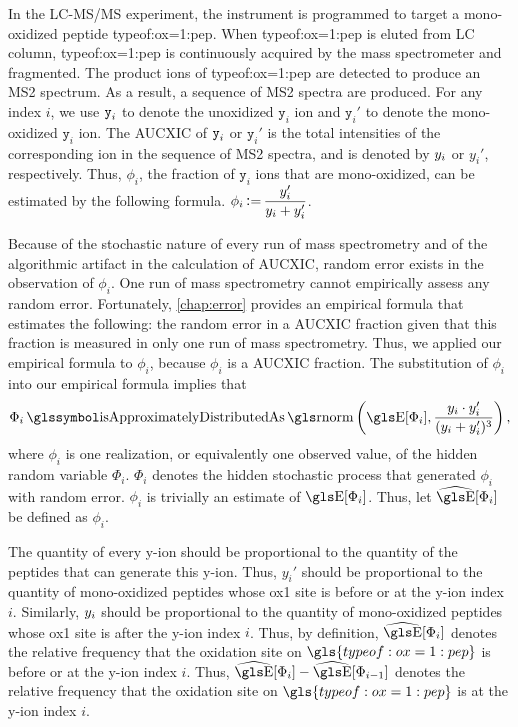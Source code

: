 In the \gls{LC-MS/MS} experiment, the instrument is programmed to target a \gls{mono-oxidized} peptide \gls{typeof:ox=1:pep}. 
When \gls{typeof:ox=1:pep} is eluted from \gls{LC} column, \gls{typeof:ox=1:pep} is continuously acquired by the mass spectrometer and fragmented. 
The product ions of \gls{typeof:ox=1:pep} are detected to produce an \gls{MS2} spectrum. 
As a result, a sequence of \gls{MS2} spectra are produced. 
For any index \(i\), we use \(\texttt{y}_i\) to denote the unoxidized \(\texttt{y}_i\) ion and \(\texttt{y}_i'\) to denote the \gls{mono-oxidized} \(\texttt{y}_i\) ion. 
The \gls{AUCXIC} of \(\texttt{y}_i\) or \(\texttt{y}_i'\) is the total intensities of the corresponding ion in the sequence of \gls{MS2} spectra, and is denoted by \(y_i\) or \(y_i'\), respectively. 
Thus, \(\phi_i\), the fraction of \(\texttt{y}_i\) ions that are \gls{mono-oxidized}, can be estimated by the following formula.
\(\displaystyle \phi_i \getsvalueof \frac{y_i'}{y_i+y_i'}\).	
	
Because of the stochastic nature of every run of mass spectrometry and of the algorithmic artifact in the calculation of \gls{AUCXIC},
	random error exists in the observation of \(\phi_i\).
One run of mass spectrometry cannot empirically assess any random error.
Fortunately, \cref{chap:error} provides an empirical formula that estimates the following: 
	the random error in a \gls{AUCXIC} fraction given that this fraction is measured in only one run of mass spectrometry.
Thus, we applied our empirical formula to \(\phi_i\), because \(\phi_i\) is a \gls{AUCXIC} fraction.
The substitution of \(\phi_i\) into our empirical formula implies that
\begin{align}
\displaystyle\Phi_i \isappdistas \rnorm\left({\E}[\Phi_i], \frac{y_i{\oxZero} \cdot y_i'}{(y_i{\oxZero} + y_i')^{3}}\right),
\label{eq:OX:methods:empirical_formula}
\end{align}
where \(\phi_i\) is one realization, or equivalently one observed value, of the hidden random variable \(\Phi_i\).
\(\Phi_i\) denotes the hidden stochastic process that generated \(\phi_i\) with random error.
\(\phi_i\) is trivially an estimate of \({\E}[\Phi_i]\).
Thus, let \({\singlehat\E}[\Phi_i]\) be defined as \(\phi_i\).
	

The quantity of every y-ion should be proportional to the quantity of the peptides that can generate this y-ion.
Thus, \( y_i'\) should be proportional to the quantity of \gls{mono-oxidized} peptides whose \gls{ox1} site is before or at the y-ion index \(i\). 
Similarly, \( y_i{}\) should be proportional to the quantity of \gls{mono-oxidized} peptides whose \gls{ox1} site is after the y-ion index \(i\).
Thus, by definition, \({\singlehat\E}[\Phi_i]\) denotes the relative frequency that the oxidation site on \(\gls{typeof:ox=1:pep}\) is before or at the y-ion index \(i\).
Thus, \(\displaystyle {\singlehat\E}[\Phi_i] - {\singlehat\E}[\Phi_{i-1}]\) denotes the relative frequency that the oxidation site on \(\gls{typeof:ox=1:pep}\) is at the y-ion index \(i\).

